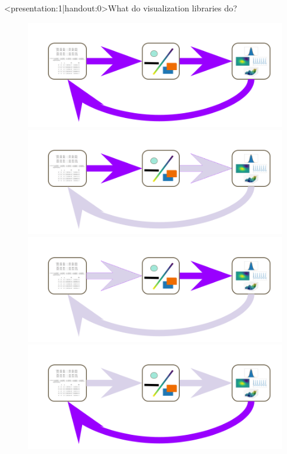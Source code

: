 \documentclass[xcolor={dvipsnames}, handout]{beamer}
\begin{document}
\begin{frame}<presentation:1|handout:0>{What do visualization libraries do?}
    \begin{figure}
        \begin{overprint}
            \includegraphics[width=\linewidth]{figures/flow/s2.png}
            \includegraphics[width=\linewidth]{figures/flow/s_vc.png}
            \includegraphics[width=\linewidth]{figures/flow/s_mark.png}
            \includegraphics[width=\linewidth]{figures/flow/s3.png}
        \end{overprint}
    \end{figure}
\end{frame}
\end{document}
